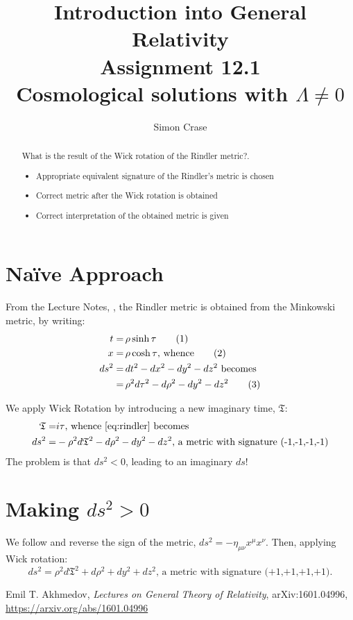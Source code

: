 \documentclass[]{article}
\title{Introduction into General Relativity\\Assignment 12.1\\Cosmological solutions with $\Lambda\ne 0$}
\author{Simon Crase}
\newcommand\numberthis{\addtocounter{equation}{1}\tag{\theequation}}
\begin{document}
\maketitle

\begin{abstract}
What is the result of the Wick rotation of the Rindler metric?.
\begin{itemize}
	\item  Appropriate equivalent signature of the Rindler's metric is chosen
	\item  Correct metric after the Wick rotation is obtained
	\item  Correct interpretation of the obtained metric is given
\end{itemize}
\end{abstract}

\section{Na\"ive Approach}
From the Lecture Notes, \cite[I, (9) \& (10)]{Akhmedov2017}, the Rindler metric is obtained from the Minkowski metric, by writing:
\begin{align*}
t=&\, \rho \sinh \tau \numberthis\label{eq:t_tau}\\
x=&\, \rho \cosh \tau \text{, whence} \numberthis\label{eq:r_rho}\\
ds^2 =&\, dt^2-dx^2-dy^2-dz^2\text{ becomes}\\
=&\, \rho^2 d\tau^2 - d\rho ^2 -dy^2-dz^2\numberthis\label{eq:rindler}
\end{align*}

We apply Wick Rotation by introducing a new imaginary time, $\mathfrak{T}$:
\begin{align*}
\mathfrak{T}=&i\tau\text{, whence \eqref{eq:rindler} becomes}\\
ds^2 =& -\rho^2 d\mathfrak{T}^2 - d\rho^2-dy^2-dz^2\text{, a metric with signature (-1,-1,-1,-1)}
\end{align*}
The problem is that $ds^2<0$, leading to an imaginary $ds$!

\section{Making $ds^2>0$}
We follow \cite{Akhmedov2017} and reverse the sign of the metric, $ds^2=-\eta_{\mu\nu}x^{\mu}x^{\nu}$. Then, applying Wick rotation:
\begin{equation*}
ds^2 = \rho^2 d\mathfrak{T}^2 + d\rho^2+dy^2+dz^2\text{, a metric with signature (+1,+1,+1,+1)}.
\end{equation*}
\begin{thebibliography}{9}\label{section:biblio}
	\raggedright
	Emil T. Akhmedov,
	\emph{Lectures on General Theory of Relativity},
	arXiv:1601.04996,
	\url{https://arxiv.org/abs/1601.04996}
\end{thebibliography}
\end{document}
